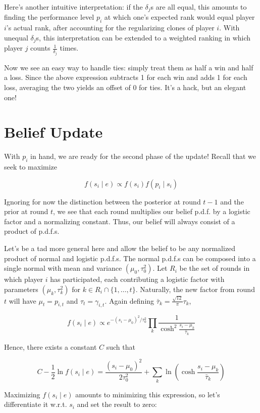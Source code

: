 \documentclass{article}
\begin{document}
Here's another intuitive interpretation: if the $\delta_j$s are all equal, this amounts to finding the performance level $p_i$ at which one's expected rank would equal player $i$'s actual rank, after accounting for the regularizing clones of player $i$. With unequal $\delta_j$s, this interpretation can be extended to a weighted ranking in which player $j$ counts $\frac{1}{\delta_j}$ times.

Now we see an easy way to handle ties: simply treat them as half a win and half a loss. Since the above expression subtracts 1 for each win and adds 1 for each loss, averaging the two yields an offset of 0 for ties. It's a hack, but an elegant one!

\section{Belief Update}

With $p_i$ in hand, we are ready for the second phase of the update! Recall that we seek to maximize

\[f(s_i\mid e) \propto f(s_i)f(p_i\mid s_i)\]

Ignoring for now the distinction between the posterior at round $t-1$ and the prior at round $t$, we see that each round multiplies our belief p.d.f. by a logistic factor and a normalizing constant. Thus, our belief will always consist of a product of p.d.f.s.

Let's be a tad more general here and allow the belief to be any normalized product of normal and logistic p.d.f.s. The normal p.d.f.s can be composed into a single normal with mean and variance $(\mu_0, \tau_0^2)$. Let $R_i$ be the set of rounds in which player $i$ has participated, each contributing a logistic factor with parameters $(\mu_k, \tau_k^2)$ for $k\in R_i\cap \{1,\ldots,t\}$. Naturally, the new factor from round $t$ will have $\mu_t = p_{i,t}$ and $\tau_t = \gamma_{i,t}$. Again defining $\bar\tau_k = \frac{\sqrt{12}}{\pi} \tau_k$,

\[
f(s_i\mid e)
\propto e^{-(s_i-\mu_0)^2/\tau_0^2} \prod_k \frac { 1 } { \cosh^2\frac{s_i-\mu_k} {\bar\tau_k} }
\]

Hence, there exists a constant $C$ such that

\[C - \frac 1 2 \ln f(s_i \mid e) = \frac{(s_i-\mu_0)^2}{2\tau_0^2} + \sum_k \ln\left( \cosh\frac{s_i-\mu_k}{\bar\tau_k} \right)\]

Maximizing $f(s_i\mid e)$ amounts to minimizing this expression, so let's differentiate it w.r.t. $s_i$ and set the result to zero:
\end{document}
